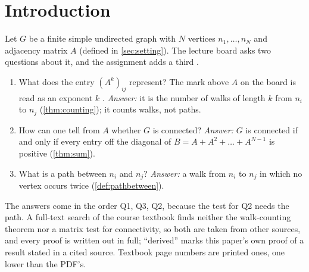 \section{Introduction}

Let $G$ be a finite simple undirected graph with $N$ vertices $n_1,\dots,n_N$
and adjacency matrix $A$ (defined in \cref{sec:setting}). The lecture board
asks two questions about it, and the assignment adds a third
\cite{whiteboard1,whiteboard2,userstatements}.
\begin{enumerate}
\item[(Q1)] What does the entry $(A^k)_{ij}$ represent? The mark above $A$ on
  the board is read as an exponent $k$ \cite{userstatements}.
  \emph{Answer:} it is the number of walks of length $k$ from $n_i$ to $n_j$
  (\cref{thm:counting}); it counts walks, not paths.
\item[(Q2)] How can one tell from $A$ whether $G$ is connected?
  \emph{Answer:} $G$ is connected if and only if every entry off the
  diagonal of $B=A+A^2+\dots+A^{N-1}$ is positive (\cref{thm:sum}).
\item[(Q3)] What is a path between $n_i$ and $n_j$? \emph{Answer:} a walk
  from $n_i$ to $n_j$ in which no vertex occurs twice
  (\cref{def:pathbetween}).
\end{enumerate}
The answers come in the order Q1, Q3, Q2, because the test for Q2 needs the path. A full-text search of the course textbook
\cite{petrosyan2015graphs} finds neither the walk-counting theorem nor a matrix test for
connectivity, so both are taken from other sources, and every proof is written out in
full; ``derived'' marks this paper's own proof of a result stated in a cited source.
Textbook page numbers are printed ones, one lower than the PDF's.

